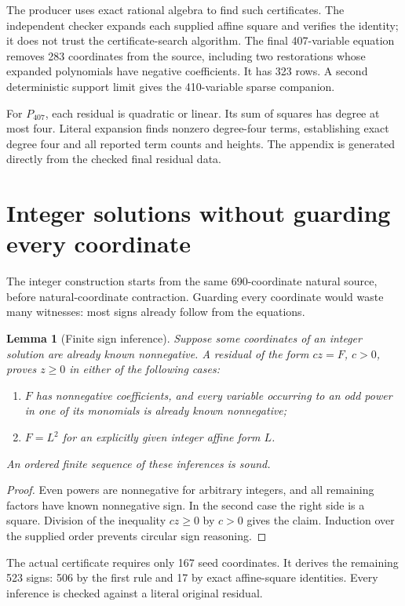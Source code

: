 \documentclass[10pt,letterpaper]{article}
\newtheorem{lemma}[theorem]{Lemma}
\theoremstyle{definition}\newtheorem{definition}[theorem]{Definition}
\theoremstyle{remark}\newtheorem{remark}[theorem]{Remark}
\newcommand{\Pn}{P_{407}}\newcommand{\Pz}{Q_{888}}\newcommand{\Ps}{Q_{917}}
\begin{document}
The producer uses exact rational algebra to find such certificates.
The independent checker expands each supplied affine square and verifies
the identity; it does not trust the certificate-search algorithm.
The final 407-variable equation removes 283 coordinates from the source,
including two restorations whose expanded polynomials have negative
coefficients. It has 323 rows. A second deterministic support limit
gives the 410-variable sparse companion.

For $\Pn$, each residual is quadratic or linear. Its sum of squares has
degree at most four. Literal expansion finds nonzero degree-four terms,
establishing exact degree four and all reported term counts and heights.
The appendix is generated directly from the checked final residual data.

\section{Integer solutions without guarding every coordinate}
\label{sec:integer}

The integer construction starts from the same 690-coordinate natural
source, before natural-coordinate contraction. Guarding every coordinate
would waste many witnesses: most signs already follow from the equations.

\begin{lemma}[Finite sign inference]\label{lem:sign}
Suppose some coordinates of an integer solution are already known
nonnegative. A residual of the form $c z=F$, $c>0$, proves $z\ge0$
in either of the following cases:
\begin{enumerate}
\item $F$ has nonnegative coefficients, and every variable occurring to
      an odd power in one of its monomials is already known nonnegative;
\item $F=L^2$ for an explicitly given integer affine form $L$.
\end{enumerate}
An ordered finite sequence of these inferences is sound.
\end{lemma}
\begin{proof}
Even powers are nonnegative for arbitrary integers, and all remaining
factors have known nonnegative sign. In the second case the right side
is a square. Division of the inequality $cz\ge0$ by $c>0$ gives the
claim. Induction over the supplied order prevents circular sign reasoning.
\end{proof}

The actual certificate requires only 167 seed coordinates. It derives the
remaining 523 signs: 506 by the first rule and 17 by exact affine-square
identities. Every inference is checked against a literal original residual.
\end{document}
